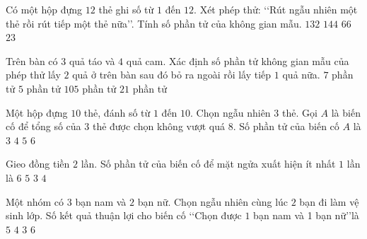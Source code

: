 \begin{ex}%
	Có một hộp đựng $12$ thẻ ghi số từ $1$ đến $12$. Xét phép thử: \lq\lq Rút ngẫu nhiên một thẻ rồi rút tiếp một thẻ nữa\rq\rq. Tính số phần tử của không gian mẫu.
	\choice
	{\True $132$}
	{$144$}
	{$66$}
	{$23$}
\end{ex}
\begin{ex}%
Trên bàn có $3$ quả táo và $4$ quả cam. Xác định số phần tử không gian mẫu của phép thử lấy $2$ quả ở trên bàn sau đó bỏ ra ngoài rồi lấy tiếp $1$ quả nữa.
	\choice
	{$7$ phần tử}
	{$5$ phần tử}
	{\True $105$ phần tử}
	{$21$ phần tử}
\end{ex}


\begin{ex}%
	Một hộp đựng $10$ thẻ, đánh số từ $1$ đến $10$. Chọn ngẫu nhiên $3$ thẻ. Gọi $A$ là biến cố để tổng số của $3$ thẻ được chọn không vượt quá $8$. Số phần tử của biến cố $A$ là
	\choice
	{$3$}
	{\True $4$}
	{$5$}
	{$6$}
	\end{ex}

\begin{ex}%
Gieo đồng tiền $2$ lần. Số phần tử của biến cố để mặt ngửa xuất hiện ít nhất $1$ lần là
	\choice
	{$6$}
	{$5$}
	{\True $3$}
	{$4$}
\end{ex}

\begin{ex}%
Một nhóm có $3$ bạn nam và $2$ bạn nữ. Chọn ngẫu nhiên cùng lúc $2$ bạn đi làm vệ sinh lớp. Số kết quả thuận lợi cho biến cố \lq\lq Chọn được $1$ bạn nam và 1 bạn nữ\rq\rq là
	\choice
	{$5$}
	{$4$}
	{$3$}
	{\True $6$}
\end{ex}

